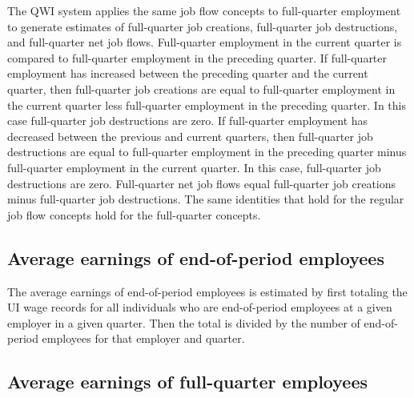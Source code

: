 
The QWI system applies the same job flow concepts to full-quarter employment
to generate estimates of full-quarter job creations, full-quarter job
destructions, and full-quarter net job flows. Full-quarter employment in the
current quarter is compared to full-quarter employment in the preceding
quarter. If full-quarter employment has increased between the preceding
quarter and the current quarter, then full-quarter job creations are equal
to full-quarter employment in the current quarter less full-quarter
employment in the preceding quarter. In this case full-quarter job
destructions are zero. If full-quarter employment has decreased between the
previous and current quarters, then full-quarter job destructions are equal
to full-quarter employment in the preceding quarter minus full-quarter
employment in the current quarter. In this case, full-quarter job
destructions are zero. Full-quarter net job flows equal full-quarter job
creations minus full-quarter job destructions. The same identities that hold
for the regular job flow concepts hold for the full-quarter concepts.

\subsection{Average earnings of end-of-period employees}


The average earnings of end-of-period employees is estimated by first
totaling the UI wage records for all individuals who are
end-of-period employees at a given employer in a given quarter. Then the
total is divided by the number of end-of-period employees for that employer
and quarter.

\subsection{Average earnings of full-quarter employees}


